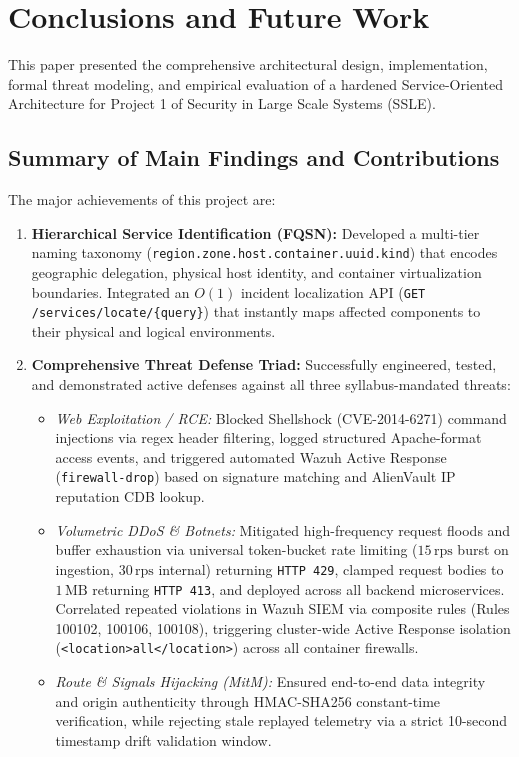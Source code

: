 \section{Conclusions and Future Work}
\label{sec:conclusion}

This paper presented the comprehensive architectural design, implementation, formal threat modeling, and empirical evaluation of a hardened Service-Oriented Architecture for Project 1 of Security in Large Scale Systems (SSLE).

\subsection{Summary of Main Findings and Contributions}
The major achievements of this project are:
\begin{enumerate}
    \item \textbf{Hierarchical Service Identification (FQSN):} Developed a multi-tier naming taxonomy (\texttt{region.zone.host.container.uuid.kind}) that encodes geographic delegation, physical host identity, and container virtualization boundaries. Integrated an $O(1)$ incident localization API (\texttt{GET /services/locate/\{query\}}) that instantly maps affected components to their physical and logical environments.
    \item \textbf{Comprehensive Threat Defense Triad:} Successfully engineered, tested, and demonstrated active defenses against all three syllabus-mandated threats:
    \begin{itemize}
        \item \textit{Web Exploitation / RCE:} Blocked Shellshock (CVE-2014-6271) command injections via regex header filtering, logged structured Apache-format access events, and triggered automated Wazuh Active Response (\texttt{firewall-drop}) based on signature matching and AlienVault IP reputation CDB lookup.
        \item \textit{Volumetric DDoS \& Botnets:} Mitigated high-frequency request floods and buffer exhaustion via universal token-bucket rate limiting ($15\,\text{rps}$ burst on ingestion, $30\,\text{rps}$ internal) returning \texttt{HTTP 429}, clamped request bodies to $1\,\text{MB}$ returning \texttt{HTTP 413}, and deployed across all backend microservices. Correlated repeated violations in Wazuh SIEM via composite rules (Rules 100102, 100106, 100108), triggering cluster-wide Active Response isolation (\texttt{<location>all</location>}) across all container firewalls.
        \item \textit{Route \& Signals Hijacking (MitM):} Ensured end-to-end data integrity and origin authenticity through HMAC-SHA256 constant-time verification, while rejecting stale replayed telemetry via a strict 10-second timestamp drift validation window.

\end{itemize}
\end{enumerate}

